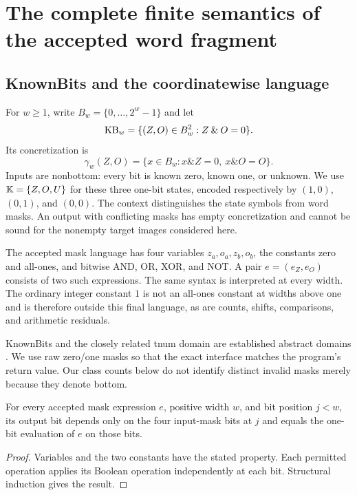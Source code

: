 \section{The complete finite semantics of the accepted word fragment}\label{sec:knownbits}

\subsection{KnownBits and the coordinatewise language}
For $w\ge1$, write $B_w=\{0,\ldots,2^w-1\}$ and let
\[
\mathrm{KB}_w=\{(Z,O)\in B_w^2:Z\mathbin{\&}O=0\}.
\]
Its concretization is
\[
\gamma_w(Z,O)=\{x\in B_w:x\mathbin{\&}Z=0,\ x\mathbin{\&}O=O\}.
\]
Inputs are nonbottom: every bit is known zero, known one, or unknown. We use
$\mathbb K=\{Z,O,U\}$ for these three one-bit states, encoded respectively by $(1,0)$, $(0,1)$, and $(0,0)$. The context distinguishes the state symbols from word masks. An output with conflicting masks has empty concretization and cannot be sound for the nonempty target images considered here.

The accepted mask language has four variables $z_a,o_a,z_b,o_b$, the constants zero and all-ones, and bitwise AND, OR, XOR, and NOT. A pair $e=(e_Z,e_O)$ consists of two such expressions. The same syntax is interpreted at every width. The ordinary integer constant $1$ is not an all-ones constant at widths above one and is therefore outside this final language, as are counts, shifts, comparisons, and arithmetic residuals.

KnownBits and the closely related tnum domain are established abstract domains \cite{LLVMKnownBits,Vishwanathan2022}. We use raw zero/one masks so that the exact interface matches the program's return value. Our class counts below do not identify distinct invalid masks merely because they denote bottom.

\begin{lemma}\label{lem:coordinate}
For every accepted mask expression $e$, positive width $w$, and bit position $j<w$, its output bit depends only on the four input-mask bits at $j$ and equals the one-bit evaluation of $e$ on those bits.
\end{lemma}
\begin{proof}
Variables and the two constants have the stated property. Each permitted operation applies its Boolean operation independently at each bit. Structural induction gives the result.
\end{proof}

